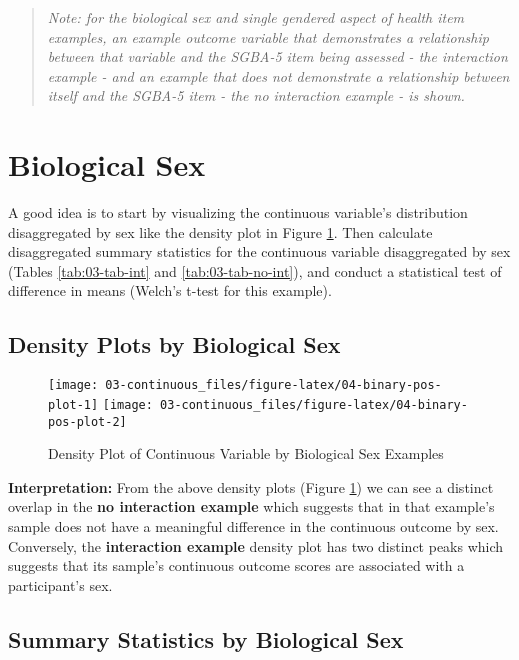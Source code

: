 \documentclass[
]{book}
\begin{document}
\begin{quote}
\emph{Note: for the biological sex and single gendered aspect of health item examples, an example outcome variable that demonstrates a relationship between that variable and the SGBA-5 item being assessed - the interaction example - and an example that does not demonstrate a relationship between itself and the SGBA-5 item - the no interaction example - is shown.}
\end{quote}

\section{Biological Sex}\label{biological-sex}

A good idea is to start by visualizing the continuous variable's distribution disaggregated by sex like the density plot in Figure \ref{fig:04-binary-pos-plot}. Then calculate disaggregated summary statistics for the continuous variable disaggregated by sex (Tables \ref{tab:03-tab-int} and \ref{tab:03-tab-no-int}), and conduct a statistical test of difference in means (Welch's t-test for this example).

\subsection{Density Plots by Biological Sex}\label{density-plots-by-biological-sex}

\begin{figure}

{\centering \texttt{[image: 03-continuous\_files/figure-latex/04-binary-pos-plot-1]} \texttt{[image: 03-continuous\_files/figure-latex/04-binary-pos-plot-2]} 

}

\caption{Density Plot of Continuous Variable by Biological Sex Examples}\label{fig:04-binary-pos-plot}
\end{figure}

\textbf{Interpretation:} From the above density plots (Figure \ref{fig:04-binary-pos-plot}) we can see a distinct overlap in the \textbf{no interaction example} which suggests that in that example's sample does not have a meaningful difference in the continuous outcome by sex. Conversely, the \textbf{interaction example} density plot has two distinct peaks which suggests that its sample's continuous outcome scores are associated with a participant's sex.

\subsection{Summary Statistics by Biological Sex}\label{summary-statistics-by-biological-sex}
\end{document}
